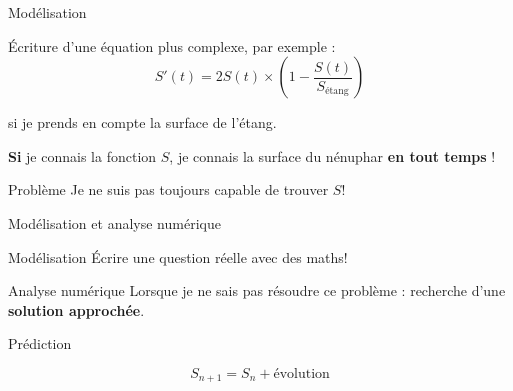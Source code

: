 \documentclass[11pt]{beamer}
\begin{document}
\begin{frame}{Modélisation}

\'Ecriture d'une équation plus complexe, par exemple :
$$
S'(t) = 2 S(t) \times \left( 1 - \dfrac{S(t)}{S_{\text{étang}}} \right)
$$

si je prends en compte la surface de l'étang.

\vspace{1cm}
\pause

\textbf{Si} je connais la fonction $S$, je connais la surface du nénuphar \textbf{en tout temps} !

\pause
\begin{block}{Problème}
Je ne suis pas toujours capable de trouver $S$!
\end{block}

\end{frame}


\begin{frame}{Modélisation et analyse numérique}

\begin{block}{Modélisation}
\'Ecrire une question réelle avec des maths!
\end{block}

\vspace{1cm}
\pause

\begin{block}{Analyse numérique}
Lorsque je ne sais pas résoudre ce problème : recherche d'une \textbf{solution approchée}.
\end{block}

\end{frame}


\begin{frame}{Prédiction}

$$S_{n+1}= S_n + \text{évolution}$$

\begin{center}
\end{center}
\end{frame}
\end{document}
